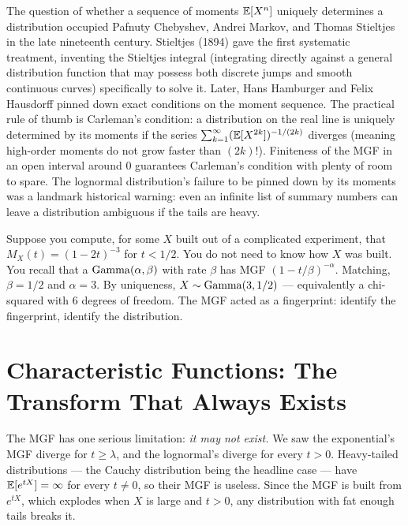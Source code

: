 \begin{connectionbox}
The question of whether a sequence of moments $\operatorname{\mathbb{E}}[X^n]$ uniquely determines a
distribution occupied Pafnuty Chebyshev, Andrei Markov, and Thomas Stieltjes in the
late nineteenth century. Stieltjes (1894) gave the first systematic treatment,
inventing the Stieltjes integral (integrating directly against a general distribution
function that may possess both discrete jumps and smooth continuous curves) specifically
to solve it. Later, Hans Hamburger and Felix Hausdorff pinned down exact conditions on
the moment sequence. The practical rule of thumb is Carleman's condition: a distribution
on the real line is uniquely determined by its moments if the series
$\sum_{k=1}^\infty (\operatorname{\mathbb{E}}[X^{2k}])^{-1/(2k)}$ diverges (meaning high-order moments do
not grow faster than $(2k)!$). Finiteness of the MGF in an open interval around $0$
guarantees Carleman's condition with plenty of room to spare. The lognormal
distribution's failure to be pinned down by its moments was a landmark historical
warning: even an infinite list of summary numbers can leave a distribution ambiguous
if the tails are heavy.
\end{connectionbox}

\begin{example}
Suppose you compute, for some $X$ built out of a complicated experiment, that
$M_X(t)=(1-2t)^{-3}$ for $t<1/2$. You do not need to know how $X$ was built. You
recall that a $\operatorname{Gamma}(\alpha,\beta)$ with rate $\beta$ has MGF
$(1-t/\beta)^{-\alpha}$. Matching, $\beta=1/2$ and $\alpha=3$. By uniqueness, $X
\sim \operatorname{Gamma}(3, 1/2)$ --- equivalently a chi-squared with $6$ degrees of freedom.
The MGF acted as a fingerprint: identify the fingerprint, identify the
distribution.
\end{example}

\section{Characteristic Functions: The Transform That Always Exists}
\label{ch18:cf}

The MGF has one serious limitation:
\emph{it may not exist.} We saw the exponential's MGF diverge for $t\ge\lambda$, and
the lognormal's diverge for every $t>0$. Heavy-tailed distributions --- the Cauchy
distribution being the headline case --- have $\operatorname{\mathbb{E}}[e^{tX}]=\infty$ for every
$t\ne 0$, so their MGF is useless. Since the MGF is built from $e^{tX}$, which
explodes when $X$ is large and $t>0$, any distribution with fat enough tails
breaks it.

